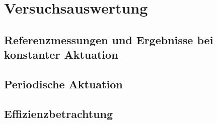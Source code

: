 \chapter{Versuchsauswertung}\label{s:auswertung}

\section{Referenzmessungen und Ergebnisse bei konstanter Aktuation}

\section{Periodische Aktuation}

\section{Effizienzbetrachtung}
